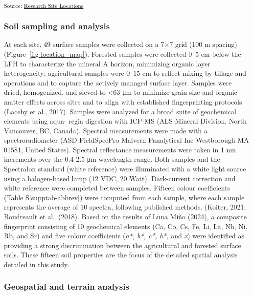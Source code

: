 \documentclass[
  number]{elsarticle}
\newcommand*\quartosupptabref[1]{Table \hyperref[#1]{S\ref{#1}}}
\begin{document}
\textsubscript{Source:
\href{https://alex-koiter.github.io/terrain-attributes/notebooks/location_map.qmd.html\#cell-fig-location_map}{Research
Site Locations}}

\subsubsection{Soil sampling and
analysis}\label{soil-sampling-and-analysis}

At each site, 49 surface samples were collected on a 7×7 grid (100 m
spacing) (Figure~\ref{fig-location_map}). Forested samples were
collected 0--5 cm below the LFH to characterize the mineral A horizon,
minimizing organic layer heterogeneity; agricultural samples were 0--15
cm to reflect mixing by tillage and operations and to capture the
actively managed surface layer. Samples were dried, homogenized, and
sieved to \textless63 μm to minimize grain-size and organic matter
effects across sites and to align with established fingerprinting
protocols (Laceby et al., 2017). Samples were analyzed for a broad suite
of geochemical elements using aqua- regia digestion with ICP-MS (ALS
Mineral Division, North Vancouver, BC, Canada). Spectral measurements
were made with a spectroradiometer (ASD FieldSpecPro Malvern Panalytical
Inc Westborough MA 01581, United States). Spectral reflectance
measurements were taken in 1 nm increments over the 0.4-2.5 μm
wavelength range. Both samples and the Spectralon standard (white
reference) were illuminated with a white light source using a
halogen-based lamp (12 VDC, 20 Watt). Dark-current correction and white
reference were completed between samples. Fifteen colour coefficients
(\quartosupptabref{supptab-abbrev}) were computed from each sample,
where each sample represents the average of 10 spectra, following
published methods. (Koiter, 2021; Boudreault et al.~(2018). Based on the
results of Luna Miño (2024), a composite fingerprint consisting of 10
geochemical elements (Ca, Co, Cs, Fe, Li, La, Nb, Ni, Rb, and Sr) and
five colour coefficients (\emph{a*, b*, c*, h*,} and \emph{x}) were
identified as providing a strong discrimination between the agricultural
and forested surface soils. These fifteen soil properties are the focus
of the detailed spatial analysis detailed in this study.

\subsubsection{Geospatial and terrain
analysis}\label{geospatial-and-terrain-analysis}
\end{document}
